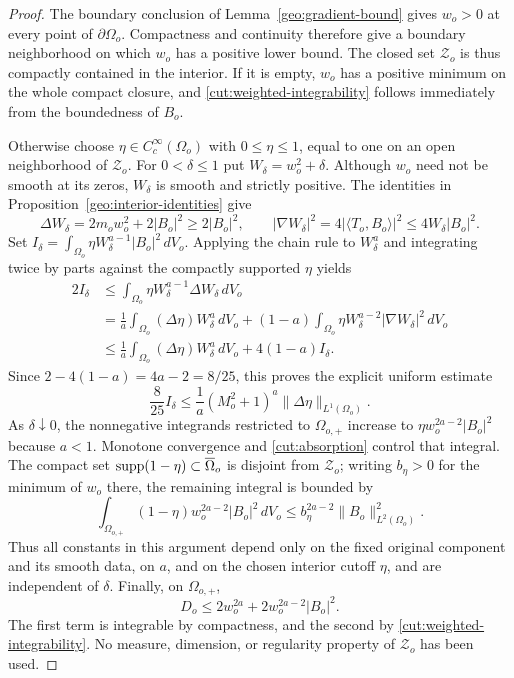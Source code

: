 \begin{proof}
The boundary conclusion of Lemma~\ref{geo:gradient-bound} gives $w_o>0$
at every point of $\partial\Omega_o$.  Compactness and continuity therefore
give a boundary neighborhood on which $w_o$ has a positive lower bound.
The closed set $\mathcal Z_o$ is thus compactly contained in the interior.
If it is empty, $w_o$ has a positive minimum on the whole compact closure,
and \eqref{cut:weighted-integrability} follows immediately from the
boundedness of $B_o$.

Otherwise choose $\eta\in C_c^\infty(\Omega_o)$ with $0\leq\eta\leq1$,
equal to one on an open neighborhood of $\mathcal Z_o$.  For $0<\delta\leq1$
put $W_\delta=w_o^2+\delta$.  Although $w_o$ need not be smooth at its
zeros, $W_\delta$ is smooth and strictly positive.  The identities in
Proposition~\ref{geo:interior-identities} give
\[
 \Delta W_\delta=2m_o w_o^2+2|B_o|^2\geq2|B_o|^2,
 \qquad
 |\nabla W_\delta|^2
 =4|\langle T_o,B_o\rangle|^2
 \leq4W_\delta|B_o|^2.
\]
Set $I_\delta=\int_{\Omega_o}\eta W_\delta^{a-1}|B_o|^2\,dV_o$.
Applying the chain rule to $W_\delta^a$ and integrating twice by parts
against the compactly supported $\eta$ yields
\begin{align*}
 2I_\delta
 &\leq \int_{\Omega_o}\eta W_\delta^{a-1}\Delta W_\delta\,dV_o\\
 &=\frac1a\int_{\Omega_o}(\Delta\eta)W_\delta^a\,dV_o
   +(1-a)\int_{\Omega_o}
       \eta W_\delta^{a-2}|\nabla W_\delta|^2\,dV_o\\
 &\leq\frac1a\int_{\Omega_o}(\Delta\eta)W_\delta^a\,dV_o
       +4(1-a)I_\delta.
\end{align*}
Since
$2-4(1-a)=4a-2=8/25$, this proves the explicit uniform estimate
\begin{equation}\label{cut:absorption}
 \frac8{25}I_\delta
 \leq \frac1a(M_o^2+1)^a\|\Delta\eta\|_{L^1(\Omega_o)}.
\end{equation}
As $\delta\downarrow0$, the nonnegative integrands restricted to
$\Omega_{o,+}$ increase to $\eta w_o^{2a-2}|B_o|^2$ because $a<1$.
Monotone convergence and \eqref{cut:absorption} control that integral.
The compact set $\operatorname{supp}(1-\eta)\subset\overline\Omega_o$ is disjoint from
$\mathcal Z_o$; writing $b_\eta>0$ for the minimum of $w_o$ there, the
remaining integral is bounded by
\[
 \int_{\Omega_{o,+}}(1-\eta)w_o^{2a-2}|B_o|^2\,dV_o
 \leq b_\eta^{2a-2}\|B_o\|_{L^2(\Omega_o)}^2.
\]
Thus all constants in this argument depend only on the fixed original
component and its smooth data, on $a$, and on the chosen interior cutoff
$\eta$, and are independent of $\delta$.  Finally, on $\Omega_{o,+}$,
\[
 D_o\leq2w_o^{2a}+2w_o^{2a-2}|B_o|^2.
\]
The first term is integrable by compactness, and the second by
\eqref{cut:weighted-integrability}.  No measure, dimension, or regularity
property of $\mathcal Z_o$ has been used.
\end{proof}

